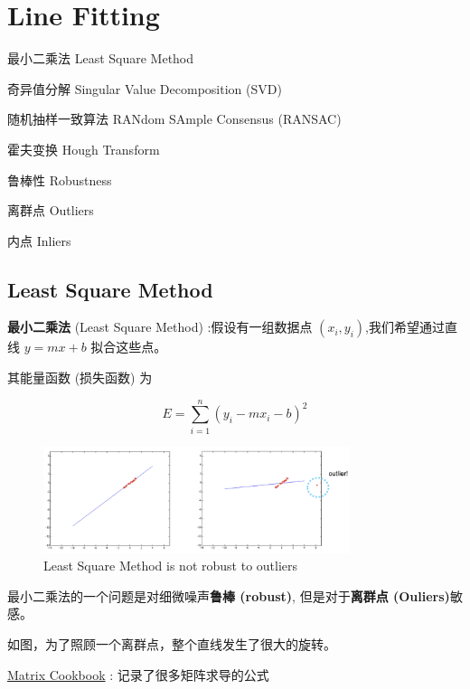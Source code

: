 \chapter{Line Fitting}

\begin{introduction}[Keywords]
    \item 最小二乘法 Least Square Method
    \item 奇异值分解 Singular Value Decomposition (SVD)
    \item 随机抽样一致算法 RANdom SAmple Consensus (RANSAC)
    \item 霍夫变换 Hough Transform
    \item 鲁棒性 Robustness
    \item 离群点 Outliers
    \item 内点 Inliers
\end{introduction}

\section{Least Square Method}

\textbf{最小二乘法} (Least Square Method) :假设有一组数据点 $(x_i, y_i)$,我们希望通过直线 $y = mx + b$ 拟合这些点。

其能量函数 (损失函数) 为

\begin{equation}
    E=\sum_{i=1}^n(y_i-mx_i-b)^2
\end{equation}

\begin{figure}[htbp]
    \centering
    \includegraphics[width=0.8\textwidth]{figures/not_roboust_outliner.png}
    \caption{Least Square Method is not robust to outliers}
\end{figure}

最小二乘法的一个问题是对细微噪声\textbf{鲁棒 (robust)}, 但是对于\textbf{离群点 (Ouliers)}敏感。

如图，为了照顾一个离群点，整个直线发生了很大的旋转。

\href{http://faculty.bicmr.pku.edu.cn/~wenzw/bigdata/matrix-cook-book.pdf}{Matrix Cookbook} : 记录了很多矩阵求导的公式


